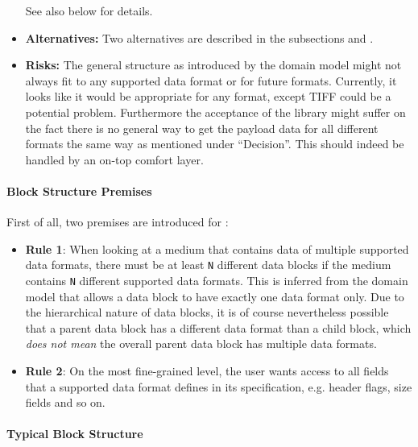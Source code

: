 \begin{itemize}
See also  below for details.
	\item \textbf{Alternatives:} Two alternatives are described in the subsections  and .
	\item \textbf{Risks:} The general structure as introduced by the domain model might not always fit to any supported data format or for future formats. Currently, it looks like it would be appropriate for any format, except TIFF could be a potential problem. Furthermore the acceptance of the library might suffer on the fact there is no general way to get the payload data for all different formats the same way as mentioned under ``Decision''. This should indeed be handled by an on-top comfort layer.
\end{itemize}


\paragraph{Block Structure Premises}
\label{sec:BlockStructureIssues}

First of all, two premises are introduced for :
\begin{itemize}
	\item \textbf{Rule 1}: When looking at a medium that contains data of multiple supported data formats, there must be at least \texttt{N} different data blocks if the medium contains \texttt{N} different supported data formats. This is inferred from the domain model that allows a data block to have exactly one data format only. Due to the hierarchical nature of data blocks, it is of course nevertheless possible that a parent data block has a different data format than a child block, which \emph{does not mean} the overall parent data block has multiple data formats.
	\item \textbf{Rule 2}: On the most fine-grained level, the user wants access to all fields that a supported data format defines in its specification, e.g. header flags, size fields and so on.
\end{itemize}


\paragraph{Typical Block Structure}
\label{sec:TypicalBlockStructure}

